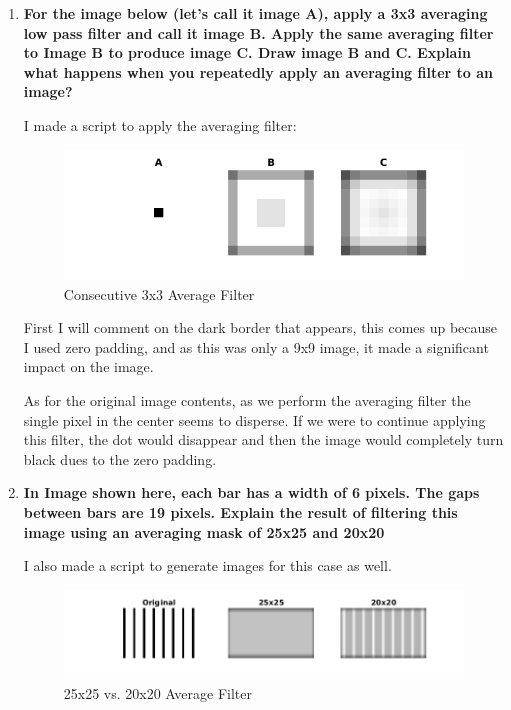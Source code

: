 \begin{enumerate}[font=\bfseries]

    \item \textbf{For the image below (let’s call it image A), apply a 3x3
    averaging low pass filter and call it image B. Apply the same averaging
    filter to Image B to produce image C.  Draw image B and C. Explain what
    happens when you repeatedly apply an averaging filter to an image?}

    
    I made a script to apply the averaging filter:

    \begin{figure}[H]
	\centering
	\includegraphics[scale=0.75]{q1.png}
	\caption{Consecutive 3x3 Average Filter}
    \end{figure}

    First I will comment on the dark border that appears, this comes up because
    I used zero padding, and as this was only a 9x9 image, it made a significant
    impact on the image.

    As for the original image contents, as we perform the averaging filter the
    single pixel in the center seems to disperse. If we were to continue
    applying this filter, the dot would disappear and then the image would
    completely turn black dues to the zero padding.

    \item \textbf{In Image shown here, each bar has a width of 6 pixels. The
    gaps between bars are 19 pixels. Explain the result of filtering this image
    using an averaging mask of 25x25 and 20x20}


    I also made a script to  generate images for this case as well.

    \begin{figure}[H]
	\centering
	\includegraphics[scale=0.6]{q2.png}
	\caption{25x25 vs. 20x20 Average Filter}
    \end{figure}


\end{enumerate}
